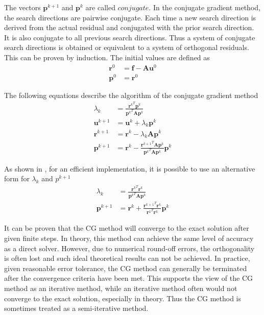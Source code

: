 The vectors $\boldsymbol{p}^{k+1}$ and $\boldsymbol{p}^k$ are called $conjugate$. In the conjugate gradient method, the search directions are pairwise conjugate. Each time a new search direction is derived from the actual residual and conjugated with the prior search direction. It is also conjugate to all previous search directions. Thus a system of conjugate search directions is obtained or equivalent to a system of orthogonal residuals. This can be proven by induction.
The initial values are defined as
\begin{align}
    \boldsymbol{r}^0 &= \boldsymbol{f} - \boldsymbol{A}\boldsymbol{u}^0 \nonumber \\ \boldsymbol{p}^0 &= \boldsymbol{r}^0
\end{align}

The following equations describe the algorithm of the conjugate gradient method
\begin{align}
    \lambda_k &= \frac{{\boldsymbol{r}^k}^T\boldsymbol{p}^k}{{\boldsymbol{p}^k}^T\boldsymbol{A}\boldsymbol{p}^k} \\
    \boldsymbol{u}^{k+1} &= \boldsymbol{u}^k + \lambda_k\boldsymbol{p}^k \\
    \boldsymbol{r}^{k+1} &= \boldsymbol{r}^k - \lambda_k\boldsymbol{A}\boldsymbol{p}^k \\
    \boldsymbol{p}^{k+1} &= \boldsymbol{r}^k - \frac{{\boldsymbol{r}^{k+1}}^T\boldsymbol{A}\boldsymbol{p}^k}{{\boldsymbol{p}^k}^T \boldsymbol{A}\boldsymbol{p}^k} \boldsymbol{p}^k %
\end{align}

As shown in \cite{https://doi.org/10.1002/zamm.19940740205}, for an efficient implementation, it is possible to use an alternative form for $\lambda_k$ and $p^{k+1}$
\begin{align}
     \lambda_k &= \frac{{\boldsymbol{r}^k}^T\boldsymbol{r}^k}{{\boldsymbol{p}^k}^T\boldsymbol{A}\boldsymbol{p}^k} \\
     \boldsymbol{p}^{k+1} &= \boldsymbol{r}^k + \frac{{\boldsymbol{r}^{k+1}}^T\boldsymbol{r}^k}{{\boldsymbol{r}^k}^T\boldsymbol{r}^k}\boldsymbol{p}^k
\end{align}

It can be proven that the CG method will converge to the exact solution after given finite steps. In theory, this method can achieve the same level of accuracy as a direct solver. However, due to numerical round-off errors, the orthogonality is often lost and such ideal theoretical results can not be achieved. In practice, given reasonable error tolerance, the CG method can generally be terminated after the convergence criteria have been met. This supports the view of the CG method as an iterative method, while an iterative method often would not converge to the exact solution, especially in theory. Thus the CG method is sometimes treated as a semi-iterative method.
